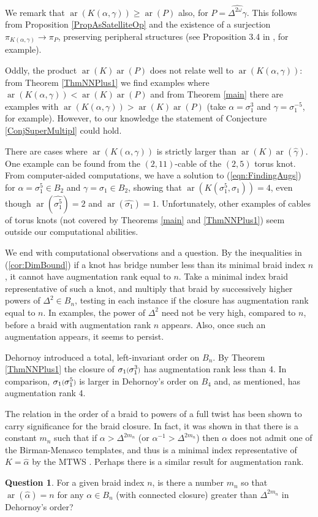 \documentclass[11pt]{amsart}
\def\s{{\sigma}}
\def\ar{\operatorname{ar}}
\newcommand*{\smallp}[1]{\scalebox{.75}{\ensuremath#1}}
\theoremstyle{definition}
\begin{document}
We remark that $\ar(K(\alpha,\gamma))\ge \ar(P)$ also, for $P=\widehat{\Delta^{2\omega}\gamma}$. This follows from Proposition \ref{PropAsSatelliteOp} and the existence of a surjection $\pi_{K(\alpha,\gamma)}\to\pi_P$, preserving peripheral structures (see Proposition 3.4 in \cite{SW}, for example). 

Oddly, the product $\ar(K)\ar(P)$ does not relate well to $\ar(K(\alpha,\gamma))$: from Theorem \ref{ThmNNPlus1} we find examples where $\ar(K(\alpha,\gamma))<\ar(K)\ar(P)$ and from Theorem \ref{main} there are examples with $\ar(K(\alpha,\gamma))>\ar(K)\ar(P)$ (take $\alpha=\s_1^3$ and $\gamma=\s_1^{-5}$, for example). However, to our knowledge the statement of Conjecture \ref{ConjSuperMultipl} could hold. 

There are cases where $\ar(K(\alpha,\gamma))$ is strictly larger than $\ar(K)\ar(\hat{\gamma})$. One example can be found from the $(2,11)$-cable of the $(2,5)$ torus knot. From computer-aided computations, we have a solution to (\ref{eqn:FindingAugs}) for $\alpha = \s_1^5\in B_2$ and $\gamma=\s_1\in B_2$, showing that $\ar(K(\s_1^5,\s_1)) = 4$, even though $\ar(\hat{\s_1^5})=2$ and $\ar(\hat{\s_1})=1$. Unfortunately, other examples of cables of torus knots (not covered by Theorems \ref{main} and \ref{ThmNNPlus1}) seem outside our computational abilities.

We end with computational observations and a question. By the inequalities in (\ref{cor:DimBound}) if a knot has bridge number less than its minimal braid index $n$, it cannot have augmentation rank equal to $n$. Take a minimal index braid representative of such a knot, and multiply that braid by successively higher powers of $\Delta^2\in B_n$, testing in each instance if the closure has augmentation rank equal to $n$. In examples, the power of $\Delta^2$ need not be very high, compared to $n$, before a braid with augmentation rank $n$ appears. Also, once such an augmentation appears, it seems to persist. 

Dehornoy introduced a total, left-invariant order on $B_n$. By Theorem \ref{ThmNNPlus1} the closure of $\s_1\smallp(\s_1^3\smallp)$ has augmentation rank less than 4. In comparison, $\s_1\smallp(\s_1^5\smallp)$ is larger in Dehornoy's order on $B_4$ and, as mentioned, has augmentation rank 4. 

The relation in the order of a braid to powers of a full twist has been shown to carry significance for the braid closure. In fact, it was shown in \cite{MN} that there is a constant $m_n$ such that if $\alpha>\Delta^{2m_n}$ (or $\alpha^{-1}>\Delta^{2m_n}$) then $\alpha$ does not admit one of the Birman-Menasco templates, and thus is a minimal index representative of $K=\hat\alpha$ by the MTWS \cite{BM_MTWS}. Perhaps there is a similar result for augmentation rank.

\newtheorem*{ques}{Question}
\begin{ques}For a given braid index $n$, is there a number $m_n$ so that $\ar(\hat\alpha)=n$ for any $\alpha\in B_n$ (with connected closure) greater than $\Delta^{2m_n}$ in Dehornoy's order?
\end{ques}



\end{document}
